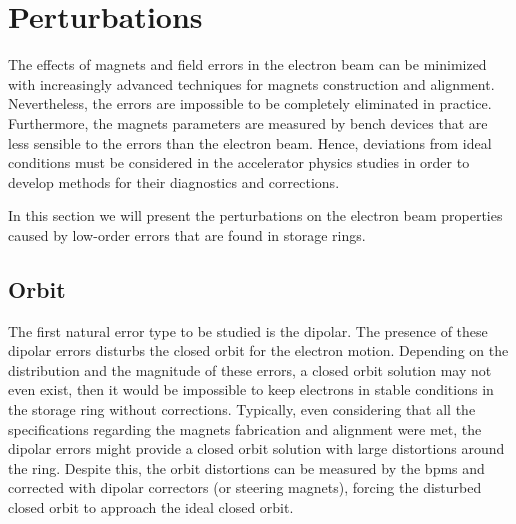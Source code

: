 
\section{Perturbations}\label{perturbations}
The effects of magnets and field errors in the electron beam can be minimized with increasingly advanced techniques for magnets construction and alignment. Nevertheless, the errors are impossible to be completely eliminated in practice. Furthermore, the magnets parameters are measured by bench devices that are less sensible to the errors than the electron beam. Hence, deviations from ideal conditions must be considered in the accelerator physics studies in order to develop methods for their diagnostics and corrections.

In this section we will present the perturbations on the electron beam properties caused by low-order errors that are found in storage rings. 
\subsection{Orbit}\label{subset:orbit}
The first natural error type to be studied is the dipolar. The presence of these dipolar errors disturbs the closed orbit for the electron motion. Depending on the distribution and the magnitude of these errors, a closed orbit solution may not even exist, then it would be impossible to keep electrons in stable conditions in the storage ring without corrections. Typically, even considering that all the specifications regarding the magnets fabrication and alignment were met, the dipolar errors might provide a closed orbit solution with large distortions around the ring. Despite this, the orbit distortions can be measured by the \gls{bpm}s and corrected with dipolar correctors (or steering magnets), forcing the disturbed closed orbit to approach the ideal closed orbit.

